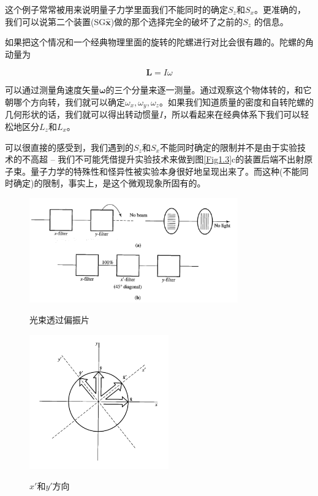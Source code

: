 \documentclass[UTF8,twoside]{ctexart}
\begin{document}
这个例子常常被用来说明量子力学里面我们不能同时的确定$S_z$和$S_x$。更准确的，我们可以说第二个装置(SG$\hat{\bm x}$)做的那个选择完全的破坏了之前的$S_z$ 的信息。

如果把这个情况和一个经典物理里面的旋转的陀螺进行对比会很有趣的。陀螺的角动量为

\begin{equation}
\bm L = I\omega
\end{equation}

\noindent 可以通过测量角速度矢量$\bm \omega$的三个分量来逐一测量。通过观察这个物体转的，和它朝哪个方向转，我们就可以确定$\omega_x, \omega_y, \omega_z$。如果我们知道质量的密度和自转陀螺的几何形状的话，我们就可以得出转动惯量$I$，所以看起来在经典体系下我们可以轻松地区分$L_z$和$L_x$。

可以很直接的感受到，我们遇到的$S_z$和$S_x$不能同时确定的限制并不是由于实验技术的不高超 -- 我们不可能凭借提升实验技术来做到图{\ref{Fig1.3}}c的装置后端不出射原子束。量子力学的特殊性和怪异性被实验本身很好地呈现出来了。而这种(不能同时确定)的限制，事实上，是这个微观现象所固有的。


\begin{figure}
\begin{centering}
\includegraphics[width = 9cm]{./Sakurai/Fig_1.4.png}
\caption{光束透过偏振片}
\label {Fig1.4}
\includegraphics[width = 6cm]{./Sakurai/Fig_1.5.png}
\caption{$x'$和$y'$方向}
\label {Fig1.5}
\end{centering}
\end{figure}
\end{document}
